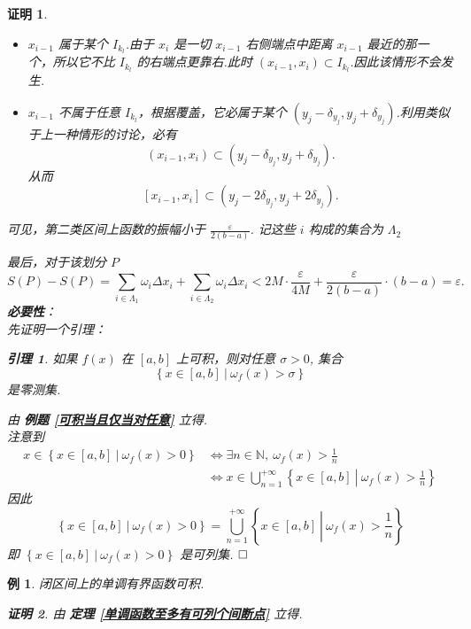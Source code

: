 \documentclass{ctexart}
\newcommand{\。}{．} %
\newcommand{\NN}{\mathbb{N}} %
\newenvironment{lanse}{
    \begin{tcolorbox}[enhanced, breakable, colback=qlan, boxrule=0pt, frame hidden,
        borderline west={0.7mm}{0.1mm}{slan}]
    }
    {\end{tcolorbox}}
\newenvironment{huangse}{
    \begin{tcolorbox}[enhanced, breakable, colback=qhuang, boxrule=0pt, frame hidden,
        borderline west={0.7mm}{0.1mm}{shuang}]
    }
    {\end{tcolorbox}}
\newenvironment{zise}{
    \begin{tcolorbox}[enhanced, breakable, colback=qzi, boxrule=0pt, frame hidden,
        borderline west={0.7mm}{0.1mm}{szi}]
    }
    {\end{tcolorbox}}
\theoremstyle{t} %
\newtheorem{lthj}{\color{szi} 例}[subsection]
\newtheorem*{zmhj}{\color{slan} 证明}
\newtheorem{ylhj}{\color{shuang} 引理}[subsection]
\newenvironment{zm}{\begin{lanse}\begin{zmhj}}{$\hfill \square$\end{zmhj}\end{lanse}}
\newenvironment{lt}{\begin{zise}\begin{lthj}}{\end{lthj}\end{zise}}
\newenvironment{yl}{\begin{huangse}\begin{ylhj}}{\end{ylhj}\end{huangse}}
\begin{document}
\begin{zm}
\begin{itemize}
        \begin{itemize}
            \item $x_{i-1}$ 属于某个 $I_{k_l}$.由于 $x_i$ 是一切 $x_{i-1}$ 右侧端点中距离 $x_{i-1}$ 最近的那一个，所以它不比 $I_{k_l}$ 的右端点更靠右.此时 $(x_{i-1}, x_i) \subset I_{k_l}$.因此该情形不会发生.
            \item $x_{i-1}$ 不属于任意 $I_{k_l}$，根据覆盖，它必属于某个 $(y_j - \delta_{y_j}, y_j + \delta_{y_j})$.利用类似于上一种情形的讨论，必有
            $$ (x_{i-1}, x_i) \subset (y_j - \delta_{y_j}, y_j + \delta_{y_j}). $$ 
            从而
            $$ [x_{i-1}, x_i] \subset (y_j - 2\delta_{y_j}, y_j + 2\delta_{y_j}). $$ 
        \end{itemize}
        可见，第二类区间上函数的振幅小于 $\frac{\varepsilon}{2(b-a)}$. 记这些 $i$ 构成的集合为 $\Lambda_2$
    \end{itemize}
    最后，对于该划分 $P$
    $$ S(P) - S(P) = \sum_{i \in \Lambda_1} \omega_i \Delta x_i + \sum_{i \in \Lambda_2} \omega_i \Delta x_i < 2M \cdot \frac{\varepsilon}{4M} + \frac{\varepsilon}{2(b-a)} \cdot (b-a) = \varepsilon. $$
    \textbf{必要性}： \\
    先证明一个引理：
    \begin{yl}
        如果 $f(x)$ 在 $[a, b]$ 上可积，则对任意 $\sigma > 0$, 集合
        \[
            \left\{x \in [a, b]\ |\ \omega_f(x) > \sigma\right\}
        \]
        是零测集.
    \end{yl}
    由 \textbf{例题 \ref{可积当且仅当对任意}} 立得. \\
    注意到
    \begin{align*}
        x \in \left\{x \in [a, b]\ | \ \omega_f(x) > 0\right\} &\Leftrightarrow \exists n \in \NN, \ \omega_f(x) > \frac{1}{n} \\
        &\Leftrightarrow x \in \bigcup_{n = 1}^{+\infty}\left\{x \in [a, b]\ \left| \ \omega_f(x) > \frac{1}{n}\right.\right\}  
    \end{align*}
    因此 
    \[
        \left\{x \in [a, b]\ | \ \omega_f(x) > 0\right\} = \bigcup_{n = 1}^{+\infty}\left\{x \in [a, b]\ \left| \ \omega_f(x) > \frac{1}{n}\right.\right\} 
    \]
    即 $\left\{x \in [a, b]\ | \ \omega_f(x) > 0\right\}$ 是可列集.
\end{zm}

\begin{lt}
    闭区间上的单调有界函数可积.
    \begin{zmhj}
        由 \textbf{定理 \ref{单调函数至多有可列个间断点}} 立得.
    \end{zmhj}
\end{lt}
\end{document}
